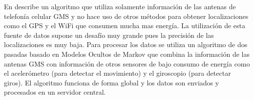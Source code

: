 En \cite{thiagarajan2011accurate} describe un algoritmo que utiliza solamente información de las antenas de telefonía celular GMS y no hace uso de otros métodos para obtener localizaciones como el GPS y el WiFi que consumen mucha mas energía. La utilización de esta fuente de datos supone un desafío muy grande pues la precisión de las localizaciones es muy baja. Para procesar los datos se utiliza un algoritmo de dos pasadas basado en Modelos Ocultos de Markov que combina la información de las antenas GMS con información de otros sensores de bajo consumo de energía como el acelerómetro (para detectar el movimiento) y el giroscopio (para detectar giros). El algoritmo funciona de forma global y los datos son enviados y procesados en un servidor central.
